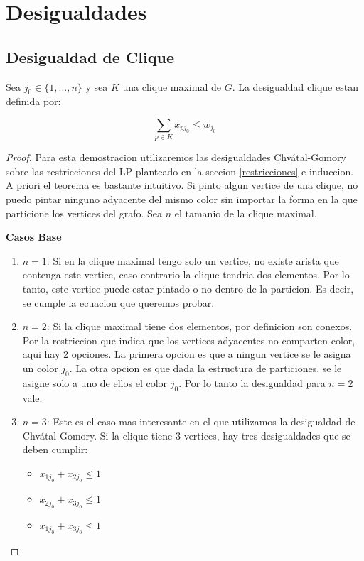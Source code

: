 \section{Desigualdades}

\subsection{Desigualdad de Clique}

Sea $j_0 \in \{1,...,n\}$ y sea $K$ una clique maximal de $G$. La desigualdad clique estan definida por:

\begin{equation}
\sum_{p \in K} x_{pj_0} \leq w_{j_0}
\end{equation}

\begin{proof}
Para esta demostracion utilizaremos las desigualdades Chvátal-Gomory sobre las restricciones del LP planteado en la seccion \ref{restricciones} e induccion. A priori el teorema es bastante intuitivo. Si pinto algun vertice de una clique, no puedo pintar ninguno adyacente del mismo color sin importar la forma en la que particione los vertices del grafo. Sea $n$ el tamanio de la clique maximal.

\hfill

\textbf{Casos Base}
\begin{enumerate}
\item $n=1$: Si en la clique maximal tengo solo un vertice, no existe arista que contenga este vertice, caso contrario la clique tendria dos elementos. Por lo tanto, este vertice puede estar pintado o no dentro de la particion. Es decir, se cumple la ecuacion que queremos probar.
\item $n=2$: Si la clique maximal tiene dos elementos, por definicion son conexos. Por la restriccion que indica que los vertices adyacentes no comparten color, aqui hay 2 opciones. La primera opcion es que a ningun vertice se le asigna un color $j_0$. La otra opcion es que dada la estructura de particiones, se le asigne solo a uno de ellos el color $j_0$. Por lo tanto la desigualdad para $n=2$ vale.
\item $n=3$: Este es el caso mas interesante en el que utilizamos la desigualdad de Chvátal-Gomory. Si la clique tiene 3 vertices, hay tres desigualdades que se deben cumplir:

\begin{itemize}
\item $x_{1j_0} + x_{2j_0} \leq 1$
\item $x_{2j_0} + x_{3j_0} \leq 1$
\item $x_{1j_0} + x_{3j_0} \leq 1$
\end{itemize}


\end{enumerate}
\end{proof}
